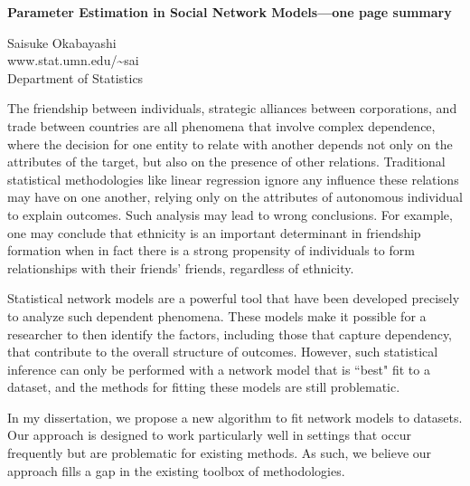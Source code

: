 \documentclass[12pt]{article}
\begin{document}
\begin{center}
{\normalsize{\textbf{Parameter Estimation in Social Network Models---one page summary}} }

\vspace{0.15in}
{Saisuke Okabayashi} \\
www.stat.umn.edu/\textasciitilde sai\\
{Department of Statistics}\\
\end{center}

The friendship between individuals, strategic alliances
between corporations, and trade between countries
are all phenomena that involve complex dependence, where the 
decision for one entity to relate with another depends not only on the attributes of 
the target, but also on the presence of other relations.  
 Traditional statistical methodologies like linear regression 
ignore any influence these relations may 
have on one another, relying only on the attributes of autonomous individual to explain outcomes.
Such analysis may lead to wrong conclusions.  For example, 
one may conclude that ethnicity is an important determinant in friendship formation when
in fact there is a strong propensity of individuals to form relationships with their friends' friends,
regardless of ethnicity.

Statistical network models are a powerful tool that have been developed 
precisely to analyze such dependent phenomena.
These models make it possible for a researcher to then identify the 
factors, including those that capture dependency, that contribute to the overall structure 
of outcomes.  
However, such statistical inference can only be performed with a network model that is ``best" fit 
to a dataset, and the methods for fitting these models are still problematic.

In my dissertation, we propose a new algorithm to fit network models to datasets.
Our approach  is designed to work particularly well in settings that occur frequently but are 
problematic for existing methods.  As such, we believe our approach fills a gap in the
existing toolbox of methodologies.



\newpage


\end{document}
